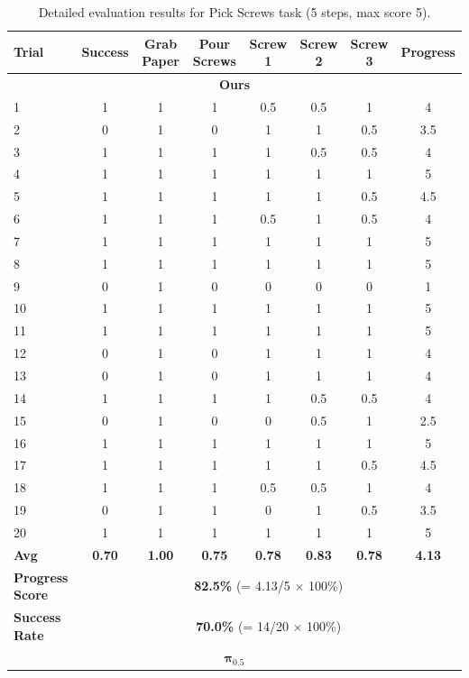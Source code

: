 \documentclass[onecolumn]{robbyant}           %
\begin{document}
\begin{table}[t]
\centering
\caption{Detailed evaluation results for Pick Screws task (5 steps, max score 5).}
\label{tab:realworld_detailed_pick_screws}
\scriptsize
\begin{tabular}{l|c|ccccc|c}
\toprule
\textbf{Trial} & \textbf{Success} & \textbf{Grab Paper} & \textbf{Pour Screws} & \textbf{Screw 1} & \textbf{Screw 2} & \textbf{Screw 3} & \textbf{Progress} \\
\midrule
\multicolumn{8}{c}{\textbf{Ours}} \\
\midrule
1  & 1 & 1 & 1 & 0.5 & 0.5 & 1 & 4 \\
2  & 0 & 1 & 0 & 1 & 1 & 0.5 & 3.5 \\
3  & 1 & 1 & 1 & 1 & 0.5 & 0.5 & 4 \\
4  & 1 & 1 & 1 & 1 & 1 & 1 & 5 \\
5  & 1 & 1 & 1 & 1 & 1 & 0.5 & 4.5 \\
6  & 1 & 1 & 1 & 0.5 & 1 & 0.5 & 4 \\
7  & 1 & 1 & 1 & 1 & 1 & 1 & 5 \\
8  & 1 & 1 & 1 & 1 & 1 & 1 & 5 \\
9  & 0 & 1 & 0 & 0 & 0 & 0 & 1 \\
10 & 1 & 1 & 1 & 1 & 1 & 1 & 5 \\
11 & 1 & 1 & 1 & 1 & 1 & 1 & 5 \\
12 & 0 & 1 & 0 & 1 & 1 & 1 & 4 \\
13 & 0 & 1 & 0 & 1 & 1 & 1 & 4 \\
14 & 1 & 1 & 1 & 1 & 0.5 & 0.5 & 4 \\
15 & 0 & 1 & 0 & 0 & 0.5 & 1 & 2.5 \\
16 & 1 & 1 & 1 & 1 & 1 & 1 & 5 \\
17 & 1 & 1 & 1 & 1 & 1 & 0.5 & 4.5 \\
18 & 1 & 1 & 1 & 0.5 & 0.5 & 1 & 4 \\
19 & 0 & 1 & 1 & 0 & 1 & 0.5 & 3.5 \\
20 & 1 & 1 & 1 & 1 & 1 & 1 & 5 \\
\midrule
\textbf{Avg} & \textbf{0.70} & \textbf{1.00} & \textbf{0.75} & \textbf{0.78} & \textbf{0.83} & \textbf{0.78} & \textbf{4.13} \\
\textbf{Progress Score} & \multicolumn{7}{c}{\textbf{82.5\%} (= 4.13/5 $\times$ 100\%)} \\
\textbf{Success Rate} & \multicolumn{7}{c}{\textbf{70.0\%} (= 14/20 $\times$ 100\%)} \\
\midrule
\multicolumn{8}{c}{$\boldsymbol{\pi_{0.5}}$} \\

\end{tabular}
\end{table}
\end{document}

